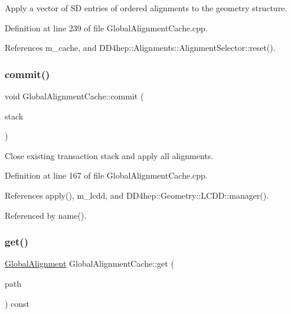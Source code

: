 Apply a vector of SD entries of ordered alignments to the geometry structure. 



Definition at line 239 of file Global\+Alignment\+Cache.\+cpp.



References m\+\_\+cache, and D\+D4hep\+::\+Alignments\+::\+Alignment\+Selector\+::reset().

\hypertarget{class_d_d4hep_1_1_alignments_1_1_global_alignment_cache_a883c1f7d0e7687caab250c4de0ed59af}{}\label{class_d_d4hep_1_1_alignments_1_1_global_alignment_cache_a883c1f7d0e7687caab250c4de0ed59af} 
\subsubsection{\texorpdfstring{commit()}{commit()}}
{\footnotesize\ttfamily void Global\+Alignment\+Cache\+::commit (\begin{DoxyParamCaption}\item[{\hyperlink{class_d_d4hep_1_1_alignments_1_1_alignment_stack}{Alignment\+Stack} \&}]{stack }\end{DoxyParamCaption})}



Close existing transaction stack and apply all alignments. 



Definition at line 167 of file Global\+Alignment\+Cache.\+cpp.



References apply(), m\+\_\+lcdd, and D\+D4hep\+::\+Geometry\+::\+L\+C\+D\+D\+::manager().



Referenced by name().

\hypertarget{class_d_d4hep_1_1_alignments_1_1_global_alignment_cache_aba2e45794e2829af7bdf5d566a0962f0}{}\label{class_d_d4hep_1_1_alignments_1_1_global_alignment_cache_aba2e45794e2829af7bdf5d566a0962f0} 
\subsubsection{\texorpdfstring{get()}{get()}}
{\footnotesize\ttfamily \hyperlink{class_d_d4hep_1_1_alignments_1_1_global_alignment}{Global\+Alignment} Global\+Alignment\+Cache\+::get (\begin{DoxyParamCaption}\item[{const std\+::string \&}]{path }\end{DoxyParamCaption}) const}



